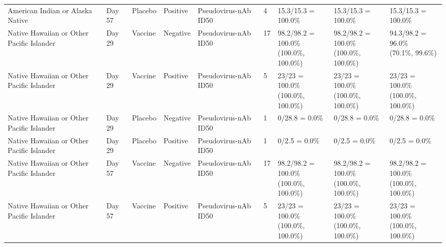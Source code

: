 \documentclass[]{book}
\theoremstyle{definition}
\theoremstyle{definition}
\theoremstyle{definition}
\newcommand{\1}{\mathbbm{1}}
\begin{document}
\begin{landscape}
\begin{ThreePartTable}
\begin{longtable}[t]{>{\raggedright\arraybackslash}p{2.7cm}llllllll}
\hspace{1em}American Indian or Alaska Native & Day 57 & Placebo & Positive & Pseudovirus-nAb ID50 & 4 & 15.3/15.3 = 100.0\% & 15.3/15.3 = 100.0\% & 15.3/15.3 = 100.0\%\\
\hspace{1em}Native Hawaiian or Other Pacific Islander & Day 29 & Vaccine & Negative & Pseudovirus-nAb ID50 & 17 & \makecell[l]{98.2/98.2 = 100.0\%\\(100.0\%, 100.0\%)} & \makecell[l]{98.2/98.2 = 100.0\%\\(100.0\%, 100.0\%)} & \makecell[l]{94.3/98.2 = 96.0\%\\(70.1\%, 99.6\%)}\\
\hspace{1em}Native Hawaiian or Other Pacific Islander & Day 29 & Vaccine & Positive & Pseudovirus-nAb ID50 & 5 & \makecell[l]{23/23 = 100.0\%\\(100.0\%, 100.0\%)} & \makecell[l]{23/23 = 100.0\%\\(100.0\%, 100.0\%)} & \makecell[l]{23/23 = 100.0\%\\(100.0\%, 100.0\%)}\\
\hspace{1em}Native Hawaiian or Other Pacific Islander & Day 29 & Placebo & Negative & Pseudovirus-nAb ID50 & 1 & 0/28.8 = 0.0\% & 0/28.8 = 0.0\% & 0/28.8 = 0.0\%\\
\hspace{1em}Native Hawaiian or Other Pacific Islander & Day 29 & Placebo & Positive & Pseudovirus-nAb ID50 & 1 & 0/2.5 = 0.0\% & 0/2.5 = 0.0\% & 0/2.5 = 0.0\%\\
\hspace{1em}Native Hawaiian or Other Pacific Islander & Day 57 & Vaccine & Negative & Pseudovirus-nAb ID50 & 17 & \makecell[l]{98.2/98.2 = 100.0\%\\(100.0\%, 100.0\%)} & \makecell[l]{98.2/98.2 = 100.0\%\\(100.0\%, 100.0\%)} & \makecell[l]{98.2/98.2 = 100.0\%\\(100.0\%, 100.0\%)}\\
\hspace{1em}Native Hawaiian or Other Pacific Islander & Day 57 & Vaccine & Positive & Pseudovirus-nAb ID50 & 5 & \makecell[l]{23/23 = 100.0\%\\(100.0\%, 100.0\%)} & \makecell[l]{23/23 = 100.0\%\\(100.0\%, 100.0\%)} & \makecell[l]{23/23 = 100.0\%\\(100.0\%, 100.0\%)}\\

\end{longtable}
\end{ThreePartTable}
\end{landscape}
\end{document}
